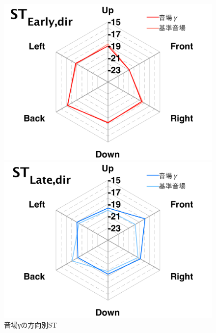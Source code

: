 \documentclass[11pt,a4j]{jreport}
\begin{document}
\newpage


\begin{figure}[H]
  \begin{minipage}[b]{.5\linewidth}
    \centering
    \includegraphics[width=1\linewidth]{images/experimentField/withLegend/03gammaOnBaseEarly.pdf}
  \end{minipage}%
  \begin{minipage}[b]{.5\linewidth}
      \centering
      \includegraphics[width=1\linewidth]{images/experimentField/withLegend/07gammaOnBaseLate.pdf}
  \end{minipage}
  \caption{音場γの方向別ST}
  \label{fig:音場γの方向別ST}
\end{figure}
\end{document}
